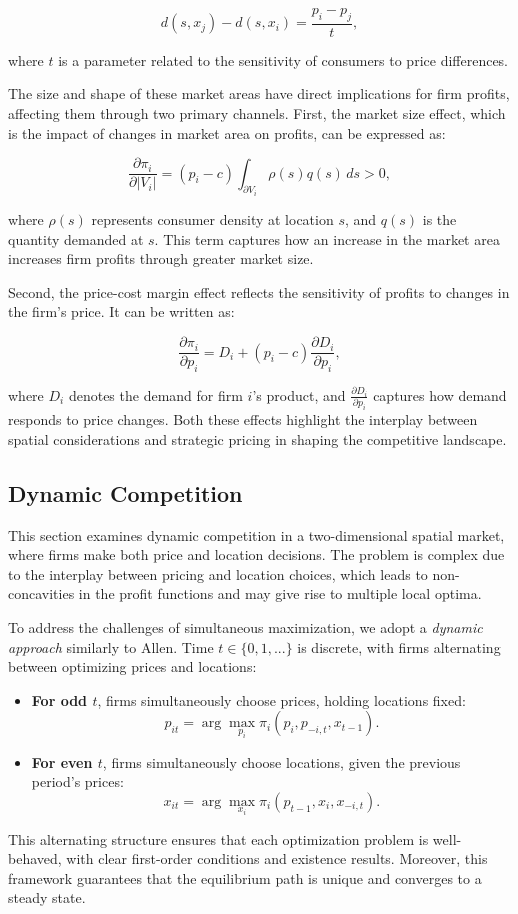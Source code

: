 \[
d(s,x_j) - d(s,x_i) = \frac{p_i - p_j}{t},
\]

where $t$ is a parameter related to the sensitivity of consumers to price differences.

The size and shape of these market areas have direct implications for firm profits, affecting them through two primary channels. First, the market size effect, which is the impact of changes in market area on profits, can be expressed as:

\[
\frac{\partial \pi_i}{\partial |V_i|} = (p_i - c)\int_{\partial V_i} \rho(s) q(s) \, ds > 0,
\]

where $\rho(s)$ represents consumer density at location $s$, and $q(s)$ is the quantity demanded at $s$. This term captures how an increase in the market area increases firm profits through greater market size.

Second, the price-cost margin effect reflects the sensitivity of profits to changes in the firm's price. It can be written as:

\[
\frac{\partial \pi_i}{\partial p_i} = D_i + (p_i - c)\frac{\partial D_i}{\partial p_i},
\]

where $D_i$ denotes the demand for firm $i$'s product, and $\frac{\partial D_i}{\partial p_i}$ captures how demand responds to price changes. Both these effects highlight the interplay between spatial considerations and strategic pricing in shaping the competitive landscape.


\subsection{Dynamic Competition}
This section examines dynamic competition in a two-dimensional spatial market, where firms make both price and location decisions. The problem is complex due to the interplay between pricing and location choices, which leads to non-concavities in the profit functions and may give rise to multiple local optima.

To address the challenges of simultaneous maximization, we adopt a \textit{dynamic approach} similarly to Allen. Time \( t \in \{0,1,...\} \) is discrete, with firms alternating between optimizing prices and locations:

\begin{itemize}
    \item \textbf{For odd \( t \)}, firms simultaneously choose prices, holding locations fixed:
    \[
        p_{it} = \arg\max_{p_i} \pi_i(p_i, p_{-i,t}, x_{t-1}).
    \]
    \item \textbf{For even \( t \)}, firms simultaneously choose locations, given the previous period's prices:
    \[
        x_{it} = \arg\max_{x_i} \pi_i(p_{t-1}, x_i, x_{-i,t}).
    \]
\end{itemize}
This alternating structure ensures that each optimization problem is well-behaved, with clear first-order conditions and existence results. Moreover, this framework guarantees that the equilibrium path is unique and converges to a steady state.

